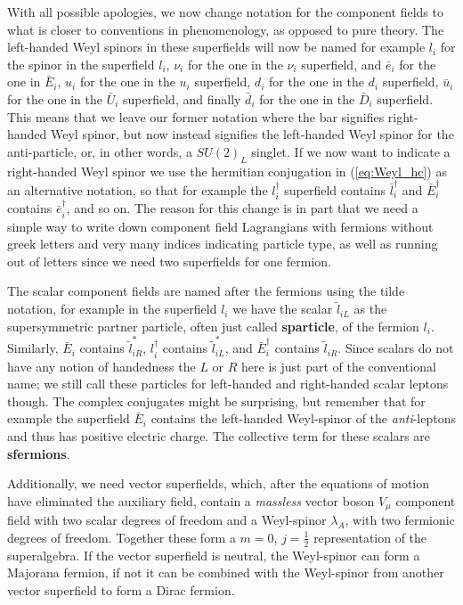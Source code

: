 \documentclass[notes.tex]{subfiles}
\begin{document}
With all possible apologies, we now change notation for the component fields to what is closer to conventions in phenomenology, as opposed to pure theory. The left-handed Weyl spinors in these superfields will now be named for example $l_i$ for the spinor in the superfield $l_i$, $\nu_i$ for the one in the $\nu_i$ superfield, and $\bar e_{i}$ for the one in $\bar E_i$,  $u_{i}$ for the one in the $u_i$ superfield, $d_i$ for the one in the $d_i$ superfield, $\bar u_i$ for the one in the $\bar U_i$ superfield,  and finally $\bar d_i$ for the one in the $\bar D_i$ superfield. This means that we leave our former notation where the bar signifies right-handed Weyl spinor, but now instead signifies the left-handed Weyl spinor for the anti-particle, or, in other words, a $SU(2)_L$ singlet. If we now want to indicate a right-handed Weyl spinor we use the hermitian conjugation in (\ref{eq:Weyl_hc}) as an alternative notation, so that for example the $l_i^\dagger$ superfield contains $\bar l_i^\dagger$ and $\bar E_i^\dagger$ contains $\bar e_i^\dagger$, and so on. The reason for this change is in part that we need a simple way to write down component field Lagrangians with fermions without greek letters and very many indices indicating particle type, as well as running out of letters since we need two superfields for one fermion.

The scalar component fields are named after the fermions using the tilde notation, for example in the superfield $l_i$ we have the scalar $\tilde l_{iL}$ as the supersymmetric partner particle, often just called {\bf sparticle}, of the fermion $l_i$.  Similarly, $\bar E_i$ contains $\tilde l_{iR}^*$, $l_i^\dagger$ contains $\tilde l_{iL}^*$, and $\bar E_i^\dagger$ contains $\tilde l_{iR}$.  Since scalars do not have any notion of handedness the $L$ or $R$ here is just part of the conventional name; we still call these particles for left-handed and right-handed  scalar leptons though.  The complex conjugates might be surprising, but remember that for example the superfield $\bar E_i$ contains the left-handed Weyl-spinor of the {\it anti}-leptons and thus has positive electric charge. The collective term for these scalars are {\bf sfermions}.

Additionally, we need vector superfields, which, after the equations of motion  have eliminated the auxiliary field, contain a {\it massless} vector boson $V_\mu$ component field with two scalar degrees of freedom and a Weyl-spinor $\lambda_A$, with two fermionic degrees of freedom. Together these form a $m=0$, $j=\frac{1}{2}$ representation of the superalgebra. If the vector superfield is neutral, the Weyl-spinor  can form a Majorana fermion, if not it can be combined with the Weyl-spinor from another vector superfield to form a Dirac fermion. 
\end{document}
